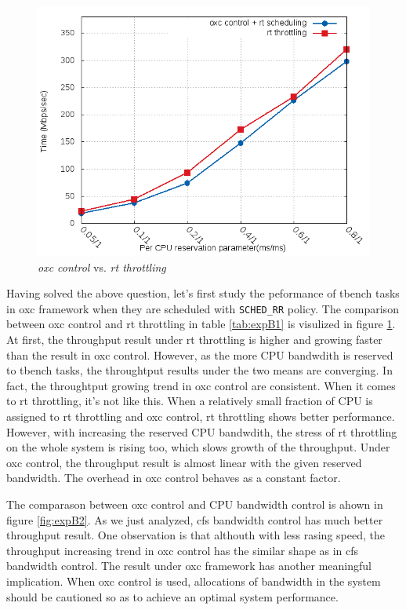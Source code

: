 \begin{figure}[htbp]
        \centering
        \includegraphics[width=\textwidth,totalheight=0.4\textheight]{images/expB1}
        \caption{\emph{oxc control} vs. \emph{rt throttling}}
        \label{fig:expB1}
\end{figure}
Having solved the above question, let's first study the peformance of tbench 
tasks in oxc framework when they are scheduled with \texttt{SCHED\_RR} 
policy. The comparison between oxc control and rt throttling in 
table \ref{tab:expB1} is visulized in figure \ref{fig:expB1}.
At first, the throughput result under rt throttling is higher and 
growing faster than the result in oxc control. However, as the more CPU 
bandwdith is reserved to tbench tasks, the throughtput results under the 
two means are converging. In fact, the throughtput growing trend in oxc 
control are consistent. When it comes to rt throttling, it's not like this.
When a relatively small fraction of CPU is assigned to rt throttling
and oxc control, rt throttling shows better performance. However, with
increasing the reserved CPU bandwdith, the stress of rt throttling on
the whole system is rising too, which slows growth of the throughput. 
Under oxc control, the throughput result is almost linear with the 
given reserved bandwidth. The overhead in oxc control behaves as 
a constant factor.

The comparason between oxc control and CPU bandwidth control is ahown 
in figure \ref{fig:expB2}. As we just analyzed, cfs bandwidth control has
much better throughput result. One observation is that althouth with
less rasing speed, the throughput increasing trend in oxc control has the
similar shape as in cfs bandwidth control. 
The result under oxc framework has another meaningful implication. 
When oxc control is used, allocations of bandwidth in the system should be
cautioned so as to achieve an optimal system performance. 

